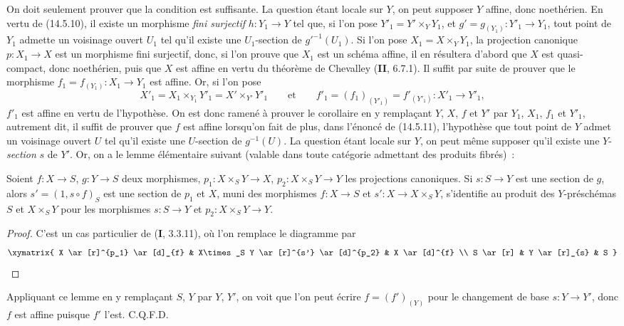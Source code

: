 On doit seulement prouver que la condition est suffisante. La question étant locale
sur $Y$, on peut supposer $Y$ affine, donc noethérien. En vertu de (14.5.10), il
existe un morphisme \emph{fini surjectif} $h:Y_1\to Y$ tel que, si l'on pose
$Y'_1=Y'\times_Y Y_1$, et $g'=g_{(Y_1)}:Y'_1\to Y_1$, tout point de $Y_1$ admette
un voisinage ouvert $U_1$ tel qu'il existe une $U_1$-section de $g'^{-1}(U_1)$. Si
l'on pose $X_1=X\times_Y Y_1$, la projection canonique $p:X_1\to X$ est un
morphisme fini surjectif, donc, si l'on prouve que $X_1$ est un schéma affine, il en
résultera d'abord que $X$ est quasi-compact, donc noethérien, puis que $X$ est affine
en vertu du théorème de Chevalley (\textbf{II}, 6.7.1). Il suffit par suite de
prouver que le morphisme $f_1=f_{(Y_1)}:X_1\to Y_1$ est affine. Or, si l'on pose
\[
  X'_1=X_1\times_{Y_1}Y'_1=X'\times_{Y'}Y'_1
  \qquad\text{et}\qquad
  f'_1=(f_1)_{(Y'_1)}=f'_{(Y'_1)}:X'_1\to Y'_1,
\]
$f'_1$ est affine en vertu de l'hypothèse. On est donc ramené à prouver le corollaire
en y remplaçant $Y$, $X$, $f$ et $Y'$ par $Y_1$, $X_1$, $f_1$ et $Y'_1$,
autrement dit, il suffit de prouver que $f$ est affine lorsqu'on fait de plus, dans
l'énoncé de (14.5.11), l'hypothèse que tout point de $Y$ admet un voisinage ouvert
$U$ tel qu'il existe une $U$-section de $g^{-1}(U)$. La question étant locale sur
$Y$, on peut même supposer qu'il existe une $Y$-\emph{section} $s$ de $Y'$. Or, on a le
lemme élémentaire suivant (valable dans toute catégorie admettant des produits
fibrés)~:

\begin{lemma}[14.5.11.1]
\label{IV.14.5.11.1-fr}
Soient $f:X\to S$, $g:Y\to S$ deux morphismes, $p_1:X\times_S Y\to X$,
$p_2:X\times_S Y\to Y$ les projections canoniques. Si $s:S\to Y$ est une section
de $g$, alors $s'=(1,s\circ f)_S$ est une section de $p_1$ et $X$, muni des
morphismes $f:X\to S$ et $s':X\to X\times_S Y$, s'identifie au produit des
$Y$-préschémas $S$ et $X\times_S Y$ pour les morphismes $s:S\to Y$ et
$p_2:X\times_S Y\to Y$.
\end{lemma}


\begin{proof}
C'est un cas particulier de (\textbf{I}, 3.3.11), où l'on remplace le diagramme par
\[
  \xymatrix{
    X \ar[r]^{p_1} \ar[d]_{f} & X\times_S Y \ar[r]^{s'} \ar[d]^{p_2} & X \ar[d]^{f} \\
    S \ar[r] & Y \ar[r]_{s} & S
  }
\]
\end{proof}
\noindent Appliquant ce lemme en y remplaçant $S$, $Y$ par $Y$, $Y'$, on voit que l'on peut
écrire $f=(f')_{(Y)}$ pour le changement de base $s:Y\to Y'$, donc $f$ est affine
puisque $f'$ l'est. C.Q.F.D.

